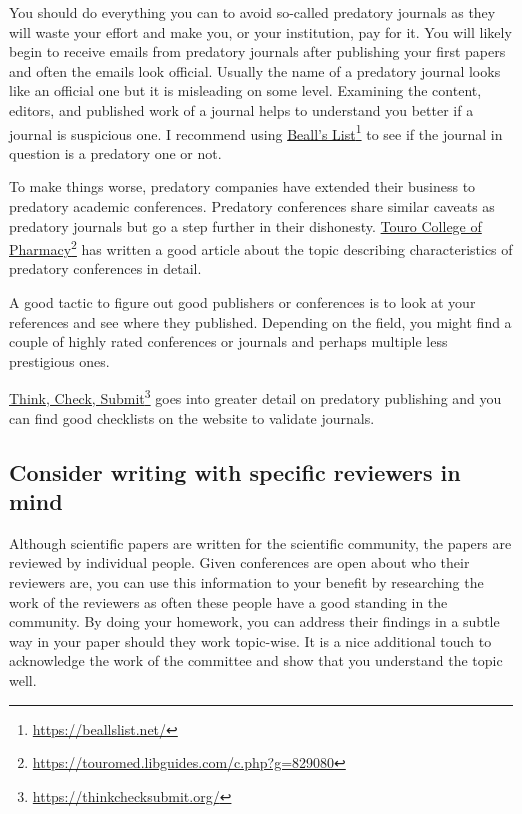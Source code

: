 You should do everything you can to avoid so-called predatory journals as they will waste your effort and make you, or your institution, pay for it.
You will likely begin to receive emails from predatory journals after publishing your first papers and often the emails look official.
Usually the name of a predatory journal looks like an official one but it is misleading on some level.
Examining the content, editors, and published work of a journal helps to understand you better if a journal is suspicious one.
I recommend using \href{https://beallslist.net/}{Beall's List}\footnote{\url{https://beallslist.net/}} to see if the journal in question is a predatory one or not.

To make things worse, predatory companies have extended their business to predatory academic conferences.
Predatory conferences share similar caveats as predatory journals but go a step further in their dishonesty.
\href{https://touromed.libguides.com/c.php?g=829080}{Touro College of Pharmacy}\footnote{\url{https://touromed.libguides.com/c.php?g=829080}} has written a good article about the topic describing characteristics of predatory conferences in detail.

A good tactic to figure out good publishers or conferences is to look at your references and see where they published.
Depending on the field, you might find a couple of highly rated conferences or journals and perhaps multiple less prestigious ones.

\href{https://thinkchecksubmit.org/}{Think, Check, Submit}\footnote{\url{https://thinkchecksubmit.org/}} goes into greater detail on predatory publishing and you can find good checklists on the website to validate journals.

\subsection{Consider writing with specific reviewers in mind}

Although scientific papers are written for the scientific community, the papers are reviewed by individual people.
Given conferences are open about who their reviewers are, you can use this information to your benefit by researching the work of the reviewers as often these people have a good standing in the community.
By doing your homework, you can address their findings in a subtle way in your paper should they work topic-wise.
It is a nice additional touch to acknowledge the work of the committee and show that you understand the topic well.

